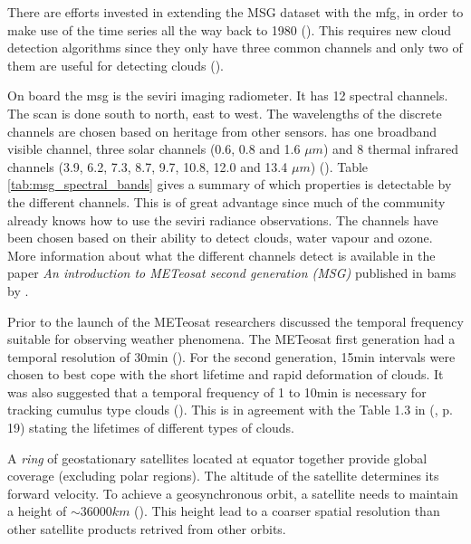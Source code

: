 There are efforts invested in extending the MSG dataset with the \acrfull{mfg}, in order to make use of the time series all the way back to 1980 (\cite{Bojanowski2018PerformanceGenerations}). This requires new cloud detection algorithms since they only have three common channels and only two of them are useful for detecting clouds (\cite{Stockli2019CloudApplications}). 


On board the \acrshort{msg} is the \acrfull{seviri} imaging radiometer. It has 12 spectral channels. The scan is done south to north, east to west. The wavelengths of the discrete channels are chosen based on heritage from other sensors.  has one broadband visible channel, three solar channels (0.6, 0.8 and 1.6 $\mu m$) and 8 thermal infrared channels (3.9, 6.2, 7.3, 8.7, 9.7, 10.8, 12.0 and 13.4 $\mu m$) (\cite{Taravat2015MultilayerMasking}). Table \ref{tab:msg_spectral_bands}
 gives a summary of which properties is detectable by the different channels. 
This is of great advantage since much of the community already knows how to use the \acrshort{seviri} radiance observations. The channels have been chosen based on their ability to detect clouds, water vapour and ozone. More information about what the different channels detect is available in the paper \textit{An introduction to METeosat second generation (MSG)} published in \acrshort{bams} by .

Prior to the launch of the METeosat researchers discussed the temporal frequency suitable for observing weather phenomena. The METeosat first generation had a temporal resolution of 30min (\cite{Stockli2019CloudApplications}). For the second generation, 15min intervals were chosen to best cope with the short lifetime and rapid deformation of clouds. It was also suggested that a temporal frequency of 1 to 10min is necessary for tracking cumulus type clouds (\cite{Schmetz_meteosat_intro}). %
This is in agreement with the Table 1.3 in \citeauthor{lohmann2016} (\citeyear{lohmann2016}, p. 19) stating the lifetimes of different types of clouds.

A \textit{ring} of geostationary satellites located at equator together provide global coverage (excluding polar regions). The altitude of the satellite determines its forward velocity. To achieve a geosynchronous orbit, a satellite needs to maintain a height of $\sim 36 000km$ (\cite{Bley2013ASEVIRI}). This height lead to a coarser spatial resolution than other satellite products retrived from other orbits. 

